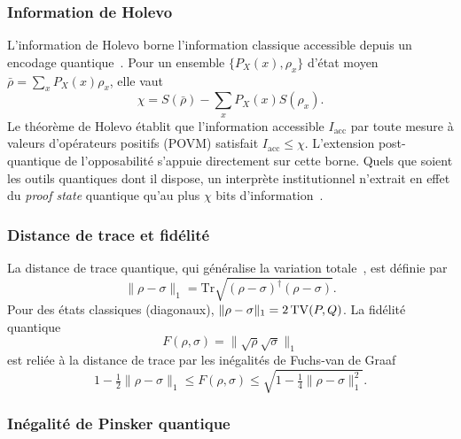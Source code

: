 \begin{sloppypar}
\subsubsection{Information de Holevo}
\label{subsubsec:holevo}

L'information de Holevo borne l'information classique accessible depuis
un encodage quantique~\cite{Holevo1973,Schumacher1997}. Pour un ensemble $\{P_X(x), \rho_x\}$ d'\'etat moyen
$\bar{\rho} = \sum_x P_X(x)\rho_x$, elle vaut
\begin{equation}
\chi = S(\bar{\rho}) - \sum_x P_X(x) S(\rho_x).
\label{eq:holevo}
\end{equation}
Le th\'eor\`eme de Holevo \'etablit que l'information accessible $I_{\mathrm{acc}}$
par toute mesure \`a valeurs d'op\'erateurs positifs (POVM) satisfait $I_{\mathrm{acc}} \leq \chi$. L'extension
post-quantique de l'opposabilit\'e s'appuie directement sur cette borne. Quels que
soient les outils quantiques dont il dispose, un interpr\`ete institutionnel n'extrait
en effet du \textit{proof state} quantique qu'au plus $\chi$ bits d'information~\cite{Winter}.

\subsubsection{Distance de trace et fid\'elit\'e}
\label{subsubsec:distance_trace_fidelite}

La distance de trace quantique, qui g\'en\'eralise la variation totale~\cite{NielsenChuang2010}, est d\'efinie par
\begin{equation}
\|\rho - \sigma\|_1 = \mathrm{Tr}\sqrt{(\rho-\sigma)^\dagger(\rho-\sigma)}.
\label{eq:trace_distance}
\end{equation}
Pour des \'etats classiques (diagonaux), $\|\rho - \sigma\|_1 = 2\operatorname{TV}(P,Q)$.
La fid\'elit\'e quantique~\cite{Jozsa}
\begin{equation}
F(\rho, \sigma) = \|\sqrt{\rho}\sqrt{\sigma}\|_1
\label{eq:fidelite}
\end{equation}
est reli\'ee \`a la distance de trace par les in\'egalit\'es de Fuchs-van de Graaf~\cite{FuchsGraaf}
\begin{equation}
1 - \tfrac{1}{2}\|\rho - \sigma\|_1 \leq F(\rho, \sigma) \leq \sqrt{1 - \tfrac{1}{4}\|\rho - \sigma\|_1^2}.
\label{eq:fuchs_vdg}
\end{equation}

\subsubsection{In\'egalit\'e de Pinsker quantique}
\label{subsubsec:pinsker_quantique}


\end{sloppypar}
